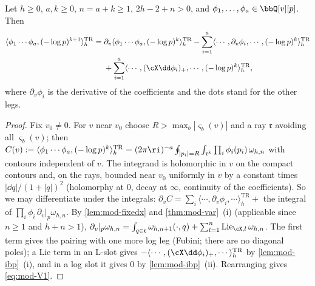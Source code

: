 \begin{prop}
\label{prop:mod-V1}
Let $h\geq 0$, $a,k\geq 0$, $n=a+k\geq 1$, $2h-2+n>0$, and $\phi_1,\dots,\phi_a\in\bbQ[v][p]$. Then
\begin{equation}
\label{eq:mod-V1}
\begin{aligned}
\langle\phi_1\cdots\phi_a,(-\log p)^{k+1}\rangle^{\mathrm{TR}}_h={}&\partial_v\langle\phi_1\cdots\phi_a,(-\log p)^k\rangle^{\mathrm{TR}}_h-\sum_{i=1}^a\langle\cdots,\partial_v\phi_i,\cdots,(-\log p)^k\rangle^{\mathrm{TR}}_h\\
&+\sum_{i=1}^a\langle\cdots,(\cX\dd\phi_i)_+,\cdots,(-\log p)^k\rangle^{\mathrm{TR}}_h ,
\end{aligned}
\end{equation}
where $\partial_v\phi_i$ is the derivative of the coefficients and the dots stand for the other legs.
\end{prop}

\begin{proof}
Fix $v_0\neq 0$. For $v$ near $v_0$ choose $R>\max_b|\varsigma_b(v)|$ and a ray $\mathfrak r$ avoiding all $\varsigma_b(v)$; then $C(v):=\langle\phi_1\cdots\phi_a,(-\log p)^k\rangle^{\mathrm{TR}}_h=(2\pi\ri)^{-a}\oint_{|p_i|=R}\int_{\mathfrak r^k}\prod_i\phi_i(p_i)\,\omega_{h,n}$ with contours independent of $v$. The integrand is holomorphic in $v$ on the compact contours and, on the rays, bounded near $v_0$ uniformly in $v$ by a constant times $|\dd q|/(1+|q|)^2$ (holomorphy at $0$, decay at $\infty$, continuity of the coefficients). So we may differentiate under the integrals: $\partial_vC=\sum_i\langle\cdots,\partial_v\phi_i,\cdots\rangle^{\mathrm{TR}}_h+$ the integral of $\prod_i\phi_i\,\partial_v|_p\omega_{h,n}$. By \cref{lem:mod-fixedx} and \cref{thm:mod-var}~(i) (applicable since $n\geq 1$ and $h+n>1$), $\partial_v|_p\omega_{h,n}=\int_{q\in\mathfrak r}\omega_{h,n+1}(\cdot,q)+\sum_{l=1}^n\mathrm{Lie}_{\cX,l}\,\omega_{h,n}$. The first term gives the pairing with one more log leg (Fubini; there are no diagonal poles); a Lie term in an L-slot gives $-\langle\cdots,(\cX\dd\phi_i)_+,\cdots\rangle^{\mathrm{TR}}_h$ by \cref{lem:mod-ibp}~(i), and in a log slot it gives $0$ by \cref{lem:mod-ibp}~(ii). Rearranging gives \eqref{eq:mod-V1}.
\end{proof}


